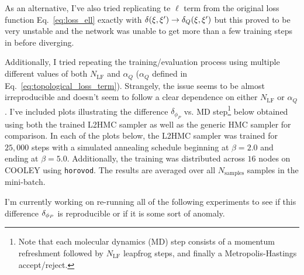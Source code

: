\documentclass[../main.tex]{subfiles}
\begin{document}
As an alternative, I've also tried replicating te $\ell$ term from the original loss function Eq.~\ref{eq:loss_ell}
exactly with $\delta(\xi,{\xi^{\prime}}) \rightarrow \delta_{Q}(\xi,{\xi^{\prime}})$ but this proved to be very unstable and the network
was unable to get more than a few training steps in before diverging.

Additionally, I tried repeating the training/evaluation process using
multiple different values of both $N_{\mathrm{LF}}$ and $\alpha_Q$ ($\alpha_Q$ defined in
Eq.~\ref{eq:topological_loss_term}).
%
Strangely, the issue seems to be almost irreproducible and doesn't seem to follow a clear dependence on either
$N_{\mathrm{LF}}$ or $\alpha_Q$.
%
I've included plots illustrating the difference $\delta_{\phi_{P}}$ vs. MD step\footnote{Note that each molecular
dynamics (MD) step consists of a momentum refreshment followed by $N_{\mathrm{LF}}$ leapfrog steps, and finally a
Metropolis-Hastings accept/reject.} below obtained using both the trained L2HMC sampler as well as the generic HMC
sampler for comparison.
%
In each of the plots below, the L2HMC sampler was trained for $25,000$ steps with a simulated annealing schedule
beginning at $\beta = 2.0$ and ending at $\beta = 5.0$.
%
Additionally, the training was distributed across $16$ nodes on COOLEY using \texttt{horovod}.
%
The results are averaged over all $N_{\mathrm{samples}}$ samples in the
mini-batch.

I'm currently working on re-running all of the following experiments to see if this difference ${\delta_{\phi_{P}}}$ is
reproducible or if it is some sort of anomaly.
\end{document}
